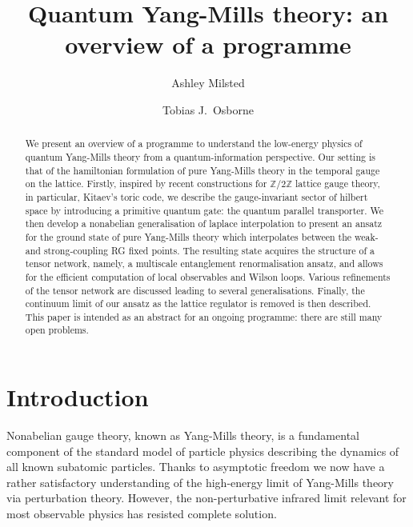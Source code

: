 \documentclass[twocolumn,lengthcheck,superscriptaddress]{revtex4-1}
\theoremstyle{definition}
\theoremstyle{remark}
\begin{document}
\title{Quantum Yang-Mills theory: an overview of a programme}

\author{Ashley Milsted}


\author{Tobias J.\ Osborne}

\begin{abstract}
We present an overview of a programme to understand the low-energy physics of quantum Yang-Mills theory from a quantum-information perspective. Our setting is that of the hamiltonian formulation of pure Yang-Mills theory in the temporal gauge on the lattice. Firstly, inspired by recent constructions for $\mathbb{Z}/2\mathbb{Z}$ lattice gauge theory, in particular, Kitaev's toric code, we describe the gauge-invariant sector of hilbert space by introducing a primitive quantum gate:  the quantum parallel transporter. We then develop a nonabelian generalisation of laplace interpolation to present an ansatz for the ground state of pure Yang-Mills theory which interpolates between the weak- and strong-coupling RG fixed points. The resulting state acquires the structure of a tensor network, namely, a multiscale entanglement renormalisation ansatz, and allows for the efficient computation of local observables and Wilson loops. Various refinements of the tensor network are discussed leading to several generalisations. Finally, the continuum limit of our ansatz as the lattice regulator is removed is then described. This paper is intended as an abstract for an ongoing programme: there are still many open problems.
\end{abstract}

\maketitle

\section{Introduction}
Nonabelian gauge theory, known as Yang-Mills theory, is a fundamental component of the standard model of particle physics describing the dynamics of all known subatomic particles. Thanks to asymptotic freedom we now have a rather satisfactory understanding of the high-energy limit of Yang-Mills theory via perturbation theory. However, the non-perturbative infrared limit relevant for most observable physics has resisted complete solution. 
\end{document}
